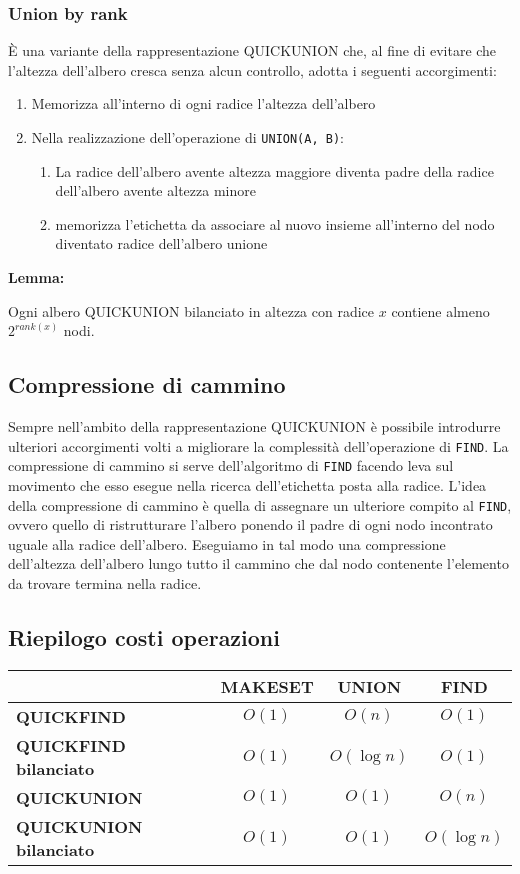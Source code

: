 \subsubsection*{Union by rank}
È una variante della rappresentazione QUICKUNION che, al fine di evitare che l'altezza dell'albero cresca senza alcun controllo,
adotta i seguenti accorgimenti:
\begin{enumerate}
    \item Memorizza all'interno di ogni radice l'altezza dell'albero
    \item Nella realizzazione dell'operazione di \texttt{UNION(A, B)}:
    \begin{enumerate}
        \item La radice dell'albero avente altezza maggiore diventa padre della radice
        dell'albero avente altezza minore
        \item memorizza l'etichetta da associare al nuovo insieme all'interno del nodo 
        diventato radice dell'albero unione
    \end{enumerate}
\end{enumerate}

\textbf{Lemma:}
\begin{center}
    Ogni albero QUICKUNION bilanciato in altezza con radice $x$ contiene almeno
    $2^{rank(x)}$ nodi.
\end{center}

\subsection{Compressione di cammino} 
Sempre nell'ambito della rappresentazione QUICKUNION è possibile introdurre ulteriori accorgimenti
volti a migliorare la complessità dell'operazione di \texttt{FIND}.
La compressione di cammino si serve dell'algoritmo di \texttt{FIND} facendo leva 
sul movimento che esso esegue nella ricerca dell'etichetta posta alla radice.
L'idea della compressione di cammino è quella di assegnare un ulteriore compito al \texttt{FIND}, 
ovvero quello di ristrutturare l'albero ponendo il padre di ogni nodo incontrato uguale
alla radice dell'albero. Eseguiamo in tal modo una compressione dell'altezza dell'albero 
lungo tutto il cammino che dal nodo contenente l'elemento da trovare termina nella radice.

\subsection{Riepilogo costi operazioni}
\begin{tabular}{|l|c|c|c|}
    \hline
    \space & \textbf{MAKESET} & \textbf{UNION} & \textbf{FIND}\\
    \hline
    \textbf{QUICKFIND} & $O(1)$ & $O(n)$ & $O(1)$\\
    \hline
    \textbf{QUICKFIND bilanciato} & $O(1)$ & $O(\log n)$ & $O(1)$\\
    \hline
    \textbf{QUICKUNION} & $O(1)$ & $O(1)$ & $O(n)$\\
    \hline
    \textbf{QUICKUNION bilanciato} & $O(1)$ & $O(1)$ & $O(\log n)$\\
    \hline
\end{tabular}
\clearpage

